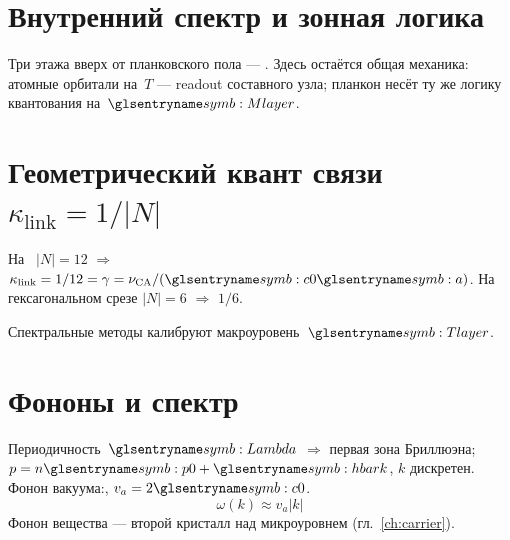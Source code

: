 \section{Внутренний спектр и зонная логика}
\label{sec:planckon-internal-spectrum}

Три этажа вверх от планковского пола --- .
Здесь остаётся общая механика: атомные орбитали на~$T$ --- readout составного узла;
планкон несёт ту же логику квантования на~$\Mlayer$.

\section{Геометрический квант связи \texorpdfstring{$\kappa_{\mathrm{link}}=1/|N|$}{kappa=1/|N|}}

\begin{proposition}
На \latGCK\ $|N|=12$ $\Rightarrow$ $\kappa_{\mathrm{link}}=1/12=\gamma=\nu_{\mathrm{CA}}/(\caSignalSpeed\caStepSpace)$.
На гексагональном срезе $|N|=6$ $\Rightarrow$ $1/6$.
\end{proposition}

Спектральные методы калибруют макроуровень~$\layerMacro$.

\section{Фононы и спектр}

Периодичность~$\carrierLattice$ $\Rightarrow$ первая зона Бриллюэна;
$p=n \ladderMomentum+\planckHbar k$, $k$ дискретен.
Фонон вакуума:, $v_a=2\caSignalSpeed$.
\[
\omega(k)\approx v_a|k|
\]
Фонон вещества --- второй кристалл над микроуровнем (гл.~\ref{ch:carrier}).
